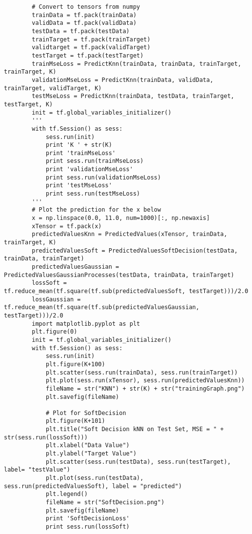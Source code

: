 \documentclass[a4paper,12pt]{article}
\begin{document}
\begin{verbatim}
        # Convert to tensors from numpy
        trainData = tf.pack(trainData)
        validData = tf.pack(validData)
        testData = tf.pack(testData)
        trainTarget = tf.pack(trainTarget)
        validtarget = tf.pack(validTarget)
        testTarget = tf.pack(testTarget)
        trainMseLoss = PredictKnn(trainData, trainData, trainTarget, trainTarget, K)
        validationMseLoss = PredictKnn(trainData, validData, trainTarget, validTarget, K)
        testMseLoss = PredictKnn(trainData, testData, trainTarget, testTarget, K)
        init = tf.global_variables_initializer()
        '''
        with tf.Session() as sess:
            sess.run(init)
            print 'K ' + str(K)
            print 'trainMseLoss'
            print sess.run(trainMseLoss)
            print 'validationMseLoss'
            print sess.run(validationMseLoss)
            print 'testMseLoss'
            print sess.run(testMseLoss)
        '''
        # Plot the prediction for the x below
        x = np.linspace(0.0, 11.0, num=1000)[:, np.newaxis]
        xTensor = tf.pack(x)
        predictedValuesKnn = PredictedValues(xTensor, trainData, trainTarget, K)
        predictedValuesSoft = PredictedValuesSoftDecision(testData, trainData, trainTarget)
        predictedValuesGaussian = PredictedValuesGaussianProcesses(testData, trainData, trainTarget)
        lossSoft = tf.reduce_mean(tf.square(tf.sub(predictedValuesSoft, testTarget)))/2.0
        lossGaussian = tf.reduce_mean(tf.square(tf.sub(predictedValuesGaussian, testTarget)))/2.0
        import matplotlib.pyplot as plt
        plt.figure(0)
        init = tf.global_variables_initializer()
        with tf.Session() as sess:
            sess.run(init)
            plt.figure(K+100)
            plt.scatter(sess.run(trainData), sess.run(trainTarget))
            plt.plot(sess.run(xTensor), sess.run(predictedValuesKnn))
            fileName = str("KNN") + str(K) + str("trainingGraph.png")
            plt.savefig(fileName)

            # Plot for SoftDecision
            plt.figure(K+101)
            plt.title("Soft Decision kNN on Test Set, MSE = " + str(sess.run(lossSoft)))
            plt.xlabel("Data Value")
            plt.ylabel("Target Value")
            plt.scatter(sess.run(testData), sess.run(testTarget), label= "testValue")
            plt.plot(sess.run(testData), sess.run(predictedValuesSoft), label = "predicted")
            plt.legend()
            fileName = str("SoftDecision.png")
            plt.savefig(fileName)
            print 'SoftDecisionLoss'
            print sess.run(lossSoft)


\end{verbatim}
\end{document}
